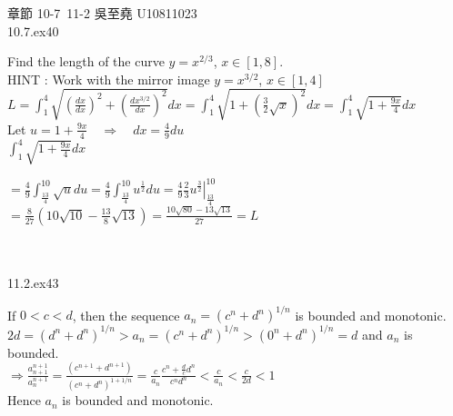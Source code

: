 \documentclass[12pt]{book}
\author{andersonwu2000}
\begin{document}
\begin{CJK}{UTF8}{bsmi}

\hfill 章節 10-7~11-2 吳至堯 U10811023 \\

10.7.ex40 \\
\begin{minipage}[t]{\dimexpr\linewidth}
Find the length of the curve $y=x^{2/3}$, $x\in[1,8]$. \\
HINT : Work with the mirror image $y=x^{3/2}$, $x\in[1,4]$ \\
$\displaystyle L=\int_1^4\sqrt{(\frac{dx}{dx})^2+(\frac{dx^{3/2}}{dx})^2}dx=\int_1^4\sqrt{1+(\frac{3}{2}\sqrt{x})^2}dx=\int_1^4\sqrt{1+\frac{9x}{4}}dx$ \\
Let $\displaystyle u=1+\frac{9x}{4}\quad\Rightarrow\quad dx=\frac{4}{9}du$ \\
$\displaystyle\int_1^4\sqrt{1+\frac{9x}{4}}dx$
\begin{minipage}[t]{\dimexpr\linewidth}
$\displaystyle=\frac{4}{9}\int_\frac{13}{4}^{10}\sqrt{u}du=\frac{4}{9}\int_\frac{13}{4}^{10}u^\frac{1}{2}du=\left.\frac{4}{9}\frac{2}{3}u^\frac{3}{2}\right|_\frac{13}{4}^{10}$ \\
$\displaystyle=\frac{8}{27}(10\sqrt{10}-\frac{13}{8}\sqrt{13})=\frac{10\sqrt{80}-13\sqrt{13}}{27}=L$
\end{minipage}
\end{minipage} \\\\

11.2.ex43 \\
\begin{minipage}[t]{\dimexpr\linewidth}
If $0<c<d$, then the sequence $a_n=(c^n+d^n)^{1/n}$ is bounded and monotonic. \\
$2d=(d^n+d^n)^{1/n}>a_n=(c^n+d^n)^{1/n}>(0^n+d^n)^{1/n}=d$ and $a_n$ is bounded. \\
$\Rightarrow\displaystyle\frac{a_{n+1}^{n+1}}{a_n^{n+1}}=\frac{(c^{n+1}+d^{n+1})}{(c^n+d^n)^{1+1/n}}=\frac{c}{a_n}\frac{c^n+\frac{d}{c}d^n}{c^nd^n}<\frac{c}{a_n}<\frac{c}{2d}<1$ \\
Hence $a_n$ is bounded and monotonic.
\end{minipage} \\\\

\end{CJK}
\end{document}
